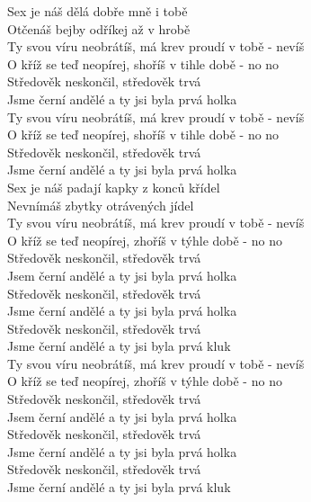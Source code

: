 \begin{multicols}{2}
\singlespacing

\sloka{}
Sex je náš dělá dobře mně i tobě\\
Otčenáš bejby odříkej až v hrobě\\
Ty svou víru neobrátíš, má krev proudí v tobě - nevíš\\
O kříž se teď neopírej, shoříš v tihle době - no no\\
Středověk neskončil, středověk trvá\\
Jsme černí andělé a ty jsi byla prvá holka\\

Ty svou víru neobrátíš, má krev proudí v tobě - nevíš\\
O kříž se teď neopírej, shoříš v tihle době - no no\\
Středověk neskončil, středověk trvá\\
Jsme černí andělé a ty jsi byla prvá holka\\

\sloka{}
Sex je náš padají kapky z konců křídel\\
Nevnímáš zbytky otrávených jídel\\
Ty svou víru neobrátíš, má krev proudí v tobě - nevíš\\
O kříž se teď neopírej, zhoříš v týhle době - no no\\
Středověk neskončil, středověk trvá\\
Jsem černí andělé a ty jsi byla prvá holka\\
Středověk neskončil, středověk trvá\\
Jsme černí andělé a ty jsi byla prvá holka\\
Středověk neskončil, středověk trvá\\
Jsme černí andělé a ty jsi byla prvá kluk\\

Ty svou víru neobrátíš, má krev proudí v tobě - nevíš\\
O kříž se teď neopírej, zhoříš v týhle době - no no\\
Středověk neskončil, středověk trvá\\
Jsem černí andělé a ty jsi byla prvá holka\\
Středověk neskončil, středověk trvá\\
Jsme černí andělé a ty jsi byla prvá holka\\
Středověk neskončil, středověk trvá\\
Jsme černí andělé a ty jsi byla prvá kluk\\

\end{multicols}